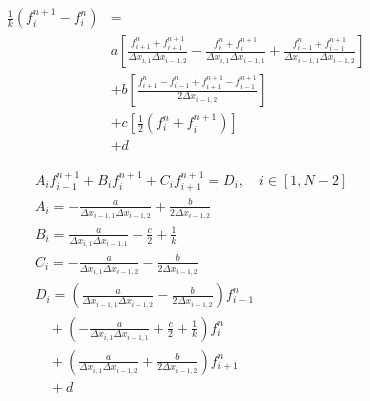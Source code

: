 \documentclass{article}
\begin{document}
    \begin{equation}
        \begin{split}
            \frac{1}{k}\left(f_i^{n+1} - f_i^n\right) &=
            \\
            & a \left[
                    \frac{f_{i+1}^n + f_{i+1}^{n+1}}
                        {\Delta x_{i,1} \Delta x_{i-1,2}}
                    - \frac{f_i^n + f_i^{n+1}}
                        {\Delta x_{i,1} \Delta x_{i-1,1}}
                    + \frac{f_{i-1}^n + f_{i-1}^{n+1}}
                        {\Delta x_{i-1,1} \Delta x_{i-1,2}}
                     \right]
            \\
            & + b \left[ 
                    \frac{f_{i+1}^n -f_{i-1}^n + f_{i+1}^{n+1} - f_{i-1}^{n+1}}
                        {2 \Delta x_{i-1,2}}
                     \right]
            \\
            & + c \left[ 
                \frac{1}{2} \left( f_i^n + f_i^{n+1} \right)
                     \right]
            \\
            & + d
        \end{split}
    \end{equation}

    \begin{equation}
        \begin{split}
            &A_i f_{i-1}^{n+1} + B_i f_i^{n+1} + C_i f_{i+1}^{n+1} = D_i, \quad i \in [1,N-2]
            \\
            &A_i =
            -\frac{a}{\Delta x_{i-1,1} \Delta x_{i-1,2}} + \frac{b}{2 \Delta x_{i-1,2}}
            \\
            &B_i =
            \frac{a}{\Delta x_{i,1} \Delta x_{i-1,1}} - \frac{c}{2}
            + \frac{1}{k}
            \\
            &C_i =
            -\frac{a}{\Delta x_{i,1} \Delta x_{i-1,2}} - \frac{b}{2 \Delta x_{i-1,2}}
            \\
            &D_i =
            \left(\frac{a}{\Delta x_{i-1,1} \Delta x_{i-1,2}} - \frac{b}{2 \Delta x_{i-1,2}}
                \right) f_{i-1}^{n}
            \\
            &\quad + \left(  - \frac{a}{\Delta x_{i,1} \Delta x_{i-1,1}}
                + \frac{c}{2} + \frac{1}{k} \right) f_i^n
            \\
            &\quad + \left(\frac{a}{\Delta x_{i,1} \Delta x_{i-1,2}} +
                \frac{b}{2 \Delta x_{i-1,2}}\right) f_{i+1}^{n}
            \\
            &\quad + d
        \end{split}
    \end{equation}
\end{document}
